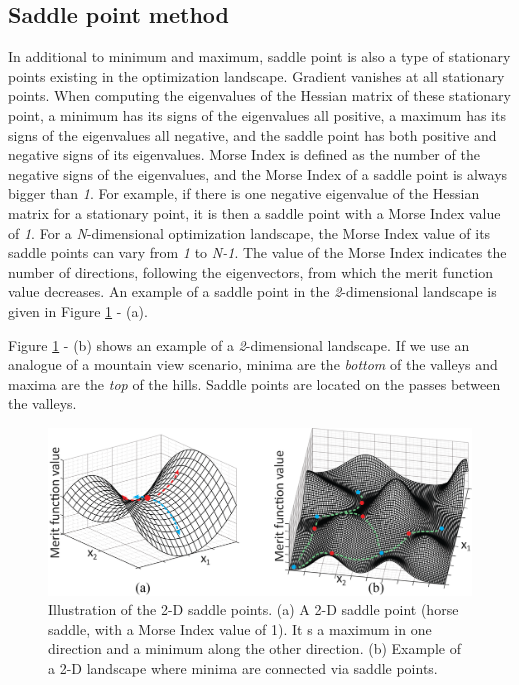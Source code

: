 \subsection{Saddle point method}
In additional to minimum and maximum, saddle point is also a type of stationary points existing in the optimization landscape. Gradient vanishes at all stationary points. When computing the eigenvalues of the Hessian matrix of these stationary point, a minimum has its signs of the eigenvalues all positive, a maximum has its signs of the eigenvalues all negative, and the saddle point has both positive and negative signs of its eigenvalues. Morse Index is defined as the number of the negative signs of the eigenvalues, and the Morse Index of a saddle point is always bigger than \textit{1}. For example, if there is one negative eigenvalue of the Hessian matrix for a stationary point, it is then a saddle point with a Morse Index value of \textit{1}. For a \textit{N}-dimensional optimization landscape, the Morse Index value of its saddle points can vary from \textit{1} to \textit{N-1}.  The value of the Morse Index indicates the number of directions, following the eigenvectors, from which the merit function value decreases. An example of a saddle point in the \textit{2}-dimensional landscape is given in Figure \ref{fig: saddle_illustration} - (a). 

Figure \ref{fig: saddle_illustration} - (b) shows an example of a \textit{2}-dimensional landscape. If we use an analogue of a mountain view scenario, minima are the \textit{bottom} of the valleys and maxima are the \textit{top} of the hills. Saddle points are located on the passes between the valleys. 

\begin{figure}
    \centering
    \includegraphics[scale=0.58]{chapter-1/figures/saddle_point_plotted.png}
    \caption{Illustration of the 2-D saddle points. (a) A 2-D saddle point (horse saddle, with a Morse Index value of 1). It s a maximum in one direction and a minimum along the other direction. (b) Example of a 2-D landscape where minima are connected via saddle points. }
    \label{fig: saddle_illustration}
\end{figure} 

